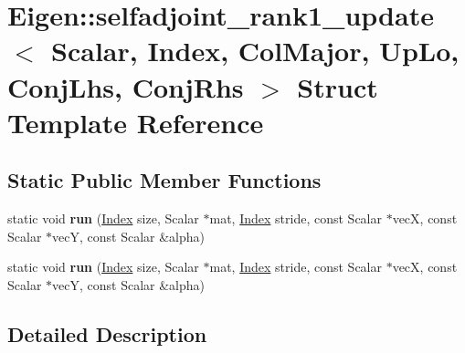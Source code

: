 \hypertarget{struct_eigen_1_1selfadjoint__rank1__update_3_01_scalar_00_01_index_00_01_col_major_00_01_up_lo_0985162e7429113fdcd7a3950b8d00f1e}{}\section{Eigen\+:\+:selfadjoint\+\_\+rank1\+\_\+update$<$ Scalar, Index, Col\+Major, Up\+Lo, Conj\+Lhs, Conj\+Rhs $>$ Struct Template Reference}
\label{struct_eigen_1_1selfadjoint__rank1__update_3_01_scalar_00_01_index_00_01_col_major_00_01_up_lo_0985162e7429113fdcd7a3950b8d00f1e}
\subsection*{Static Public Member Functions}
\begin{DoxyCompactItemize}
\item 
\mbox{\label{struct_eigen_1_1selfadjoint__rank1__update_3_01_scalar_00_01_index_00_01_col_major_00_01_up_lo_0985162e7429113fdcd7a3950b8d00f1e_a2ff1df182b583b1d70d12885ce11b484}} 
static void {\bfseries run} (\hyperlink{namespace_eigen_a62e77e0933482dafde8fe197d9a2cfde}{Index} size, Scalar $\ast$mat, \hyperlink{namespace_eigen_a62e77e0933482dafde8fe197d9a2cfde}{Index} stride, const Scalar $\ast$vecX, const Scalar $\ast$vecY, const Scalar \&alpha)
\item 
\mbox{\label{struct_eigen_1_1selfadjoint__rank1__update_3_01_scalar_00_01_index_00_01_col_major_00_01_up_lo_0985162e7429113fdcd7a3950b8d00f1e_a2ff1df182b583b1d70d12885ce11b484}} 
static void {\bfseries run} (\hyperlink{namespace_eigen_a62e77e0933482dafde8fe197d9a2cfde}{Index} size, Scalar $\ast$mat, \hyperlink{namespace_eigen_a62e77e0933482dafde8fe197d9a2cfde}{Index} stride, const Scalar $\ast$vecX, const Scalar $\ast$vecY, const Scalar \&alpha)
\end{DoxyCompactItemize}


\subsection{Detailed Description}
